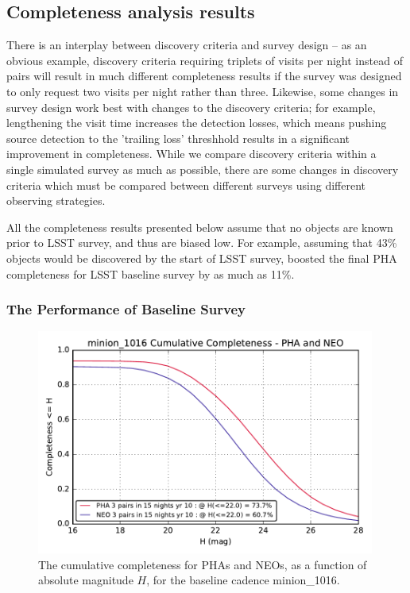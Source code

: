 \subsection{Completeness analysis results}

There is an interplay between discovery criteria and survey design -- as an obvious example, discovery criteria requiring triplets of visits per night instead of pairs will result in much different completeness results if the survey was designed to only request two visits per night rather than three. Likewise, some changes in survey design work best with changes to the discovery criteria; for example, lengthening the visit time increases the detection losses, which means pushing source detection to the 'trailing loss' threshhold results in a significant improvement in completeness. While we compare discovery criteria within a single simulated survey as much as possible, there are some changes in discovery criteria which must be compared between different surveys using different observing strategies.

All the completeness results presented below assume that no objects are known prior to LSST survey,
and thus are biased low. For example, assuming that 43\% objects would be discovered by the start of
LSST survey, \cite{GMS2016} boosted the final PHA completeness for LSST baseline survey by as much
as 11\%.  


\subsubsection{The Performance of Baseline Survey} 

\begin{figure}[t!]
\centering
\includegraphics[width=0.99\textwidth]{figures/minion_1016_CumulativeCompleteness_NEO_and_PHA_Cumulative_Completeness}
\vskip -0.2in 
\caption{The cumulative completeness for PHAs and NEOs, as a function of absolute magnitude $H$, for the baseline
cadence minion\_1016. 
\label{fig:minionC1}}
\end{figure}

